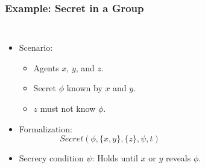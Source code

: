 \documentclass[aspectratio=169]{beamer}
\begin{document}
\begin{frame}
\frametitle{Example: Secret in a Group}

\begin{columns}[c]




\Large
\begin{itemize}
    \item Scenario:
    \begin{itemize}
        \item Agents $x$, $y$, and $z$.
        \item Secret $\phi$ known by $x$ and $y$.
        \item $z$ must not know $\phi$.
    \end{itemize}
    \item Formalization:
    \[
    Secret(\phi, \{x,y\}, \{z\}, \psi, t)
    \]
    \item Secrecy condition $\psi$: Holds until $x$ or $y$ reveals $\phi$.
\end{itemize}



\end{columns}
\end{frame}
\end{document}
